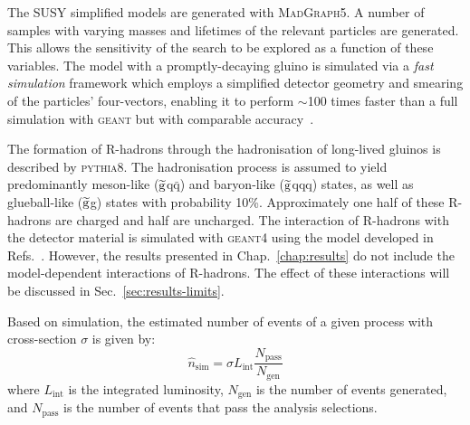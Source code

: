 The SUSY %
simplified models are generated with \textsc{MadGraph5}. A number of samples 
with varying masses and lifetimes of the relevant particles are generated. 
This allows the sensitivity of the search to be explored as a function of 
these variables.
The model with a promptly-decaying gluino is simulated via a 
\textit{fast simulation} framework which employs a simplified detector geometry 
and smearing of the particles' four-vectors, enabling it to perform $\sim$100 
times faster than a full simulation with \textsc{geant} but with comparable 
accuracy~\cite{fastsim}.


The formation of R-hadrons through the hadronisation of long-lived gluinos is 
described by 
\textsc{pythia8}. The hadronisation process is assumed to yield predominantly 
meson-like ($\mathrm{\widetilde{g}}$q$\bar{\mathrm q}$) and baryon-like ($\mathrm{\widetilde{g}}$qqq) states, 
as well as glueball-like ($\mathrm{\widetilde{g}}$g) states with probability 10\%. 
Approximately one half of these R-hadrons are charged and half are uncharged. 
The interaction of R-hadrons with the detector material is simulated with 
\textsc{geant4} using the model developed in 
Refs.~\cite{cloudmodel1,cloudmodel2}. 
However, the results presented in Chap.~\ref{chap:results} do not include the 
model-dependent interactions of R-hadrons. The effect of these interactions 
will be discussed in Sec.~\ref{sec:results-limits}.


Based on simulation, the estimated number of events of a given process with 
cross-section $\sigma$ is given by:
\begin{equation}
\hat{n}_\mathrm{sim} = \sigma L_\mathrm{int} 
\frac{N_{\mathrm{pass}}}{N_{\mathrm{gen}}}
\end{equation}
where $L_\mathrm{int}$ is the integrated luminosity, $N_{\mathrm{gen}}$ is the 
number of events generated, and $N_{\mathrm{pass}}$ is the number of events 
that pass the analysis selections.


